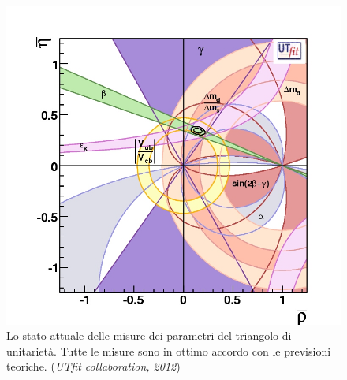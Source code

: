 \begin{figure}
\begin{center}
\includegraphics[scale=0.4]{Immagini/triangoloUTfit}
\caption{Lo stato attuale delle misure dei parametri del triangolo di unitarietà. Tutte le misure sono in ottimo accordo con le previsioni teoriche. (\emph{UTfit collaboration, 2012})}
\end{center}
\end{figure}